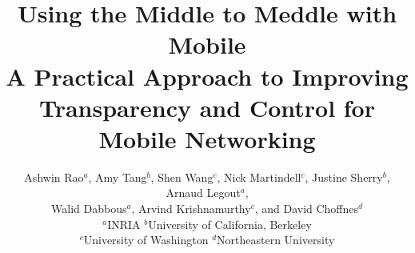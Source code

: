 \documentclass[letterpaper,twocolumn,10pt]{sig-alternate-10pt}
\begin{document}
\date{}

\title{{\Large \bf Using the Middle to Meddle with Mobile} \\
{\large A Practical Approach to Improving Transparency and Control for Mobile Networking}}

\author{ 
Ashwin Rao${^a}$, Amy Tang${^b}$, Shen Wang${^c}$, Nick Martindell${^c}$, Justine Sherry${^b}$, Arnaud Legout${^a}$, \\
 Walid Dabbous${^a}$, Arvind Krishnamurthy${^c}$, and David Choffnes${^d}$\\ 
$^{a}$INRIA $^{b}$University of California, Berkeley \\
$^{c}$University of Washington $^{d}$Northeastern University
} 

\maketitle





















{\footnotesize 
}

\end{document}

